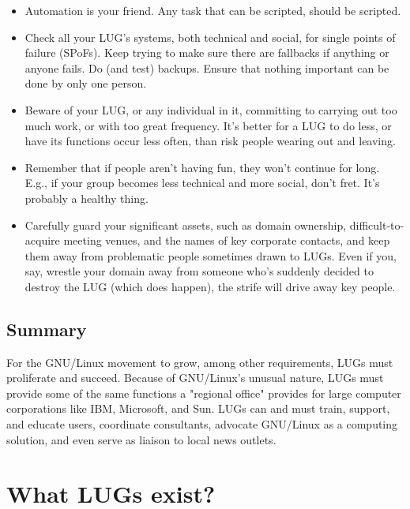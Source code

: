 \documentclass{HOWTO}
\begin{document}
\begin{itemize}
\item Automation is your friend.  Any task that can be scripted, 
should be scripted.
\item Check all your LUG's systems, both technical and social,
for single points of failure (SPoFs).  Keep trying to make sure there are
fallbacks if anything or anyone fails.  Do (and test) backups.  Ensure that nothing
important can be done by only one person.
\item Beware of your LUG, or any individual in it, committing 
to carrying out too much work, or with too great frequency.  It's 
better for a LUG to do less, or have its functions occur less often,
than risk people wearing out and leaving.
\item Remember that if people aren't having fun, they won't 
continue for long.  E.g., if your group becomes less technical and 
more social, don't fret.  It's probably a healthy thing.
\item Carefully guard your significant assets, such as domain
ownership, difficult-to-acquire meeting venues, and the names of key
corporate contacts, and keep them away from problematic people sometimes
drawn to LUGs.  Even if you, say, wrestle your domain away from someone
who's suddenly decided to destroy the LUG (which does happen), the
strife will drive away key people.
\end{itemize}







\subsection{Summary}

For the GNU/Linux movement to grow, among other requirements,
LUGs must proliferate and succeed.  Because of GNU/Linux's
unusual nature, LUGs must provide some of the same functions a "regional
office" provides for large computer corporations like IBM, Microsoft,
and Sun. LUGs can and must train, support, and educate users,
coordinate consultants, advocate GNU/Linux as a computing solution,
and even serve as liaison to local news outlets.




\section{What LUGs exist?}
\end{document}
